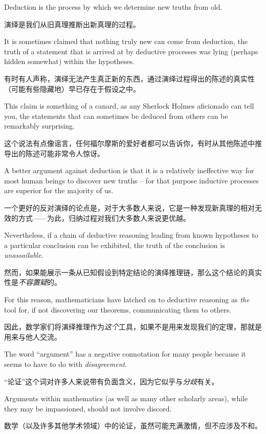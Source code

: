 Deduction 
is the process by which we determine new truths from old.

演绎是我们从旧真理推断出新真理的过程。

It is sometimes claimed that nothing truly new can come from deduction, 
the truth of a statement that is arrived at by deductive processes was 
lying (perhaps hidden somewhat) within the hypotheses.

有时有人声称，演绎无法产生真正新的东西，通过演绎过程得出的陈述的真实性（可能有些隐藏地）早已存在于假设之中。

This claim is something
of a canard, as any Sherlock Holmes aficionado can tell you, the statements
that can sometimes be deduced from others can be remarkably surprising.

这个说法有点像谣言，任何福尔摩斯的爱好者都可以告诉你，有时从其他陈述中推导出的陈述可能非常令人惊讶。

A better
argument against deduction is that it is a relatively ineffective way for most 
human beings to discover new truths -- for that purpose inductive processes are
superior for the majority of us.

一个更好的反对演绎的论点是，对于大多数人来说，它是一种发现新真理的相对无效的方式——为此，归纳过程对我们大多数人来说更优越。

Nevertheless, if a chain of deductive reasoning
leading from known hypotheses to a particular conclusion can be exhibited, the truth
of the conclusion is \emph{unassailable}.

然而，如果能展示一条从已知假设到特定结论的演绎推理链，那么这个结论的真实性是\emph{不容置疑}的。

For this reason, mathematicians have 
latched on to deductive reasoning as \emph{the} tool for, if not discovering 
our theorems, communicating them to others.

因此，数学家们将演绎推理作为\emph{这个}工具，如果不是用来发现我们的定理，那就是用来与他人交流。

The word ``argument'' has a negative connotation for many people because 
it seems to have to do with {\em disagreement}.

“论证”这个词对许多人来说带有负面含义，因为它似乎与{\em 分歧}有关。

Arguments within mathematics
(as well as many other scholarly areas), while they may be impassioned, should
not involve discord.

数学（以及许多其他学术领域）中的论证，虽然可能充满激情，但不应涉及不和。

